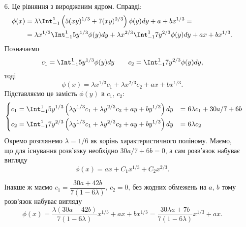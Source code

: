 \begin{solution}
\begin{enumerate}
        \item[6.] Це рівняння з виродженим ядром. Справді: 
        \begin{equation*} \begin{aligned}
        \phi(x) &= \lambda\Int_{-1}^1 \left(5(xy)^{1/3} + 7(xy)^{2/3}\right) \phi(y) dy + a + bx^{1/3} = \\ 
        &= \lambda x^{1/3}\Int_{-1}^1 5y^{1/3}\phi(y) dy + \lambda x^{2/3}\Int_{-1}^1 7y^{2/3} \phi(y) dy + ax + bx^{1/3}. 
        \end{aligned} \end{equation*}
        Позначаємо
        \[ c_1 = \Int_{-1}^1 5y^{1/3} \phi(y) dy \qquad c_2 = \Int_{-1}^1 7y^{2/3} \phi(y) dy, \]
        тоді
        \[ \phi(x) = \lambda x^{1/3} c_1 + \lambda x^{2/3} c_2 + ax + bx^{1/3}. \]
        Підставляємо це замість $\phi(y)$ в $c_1$, $c_2$:
        \begin{equation*}\left\{\begin{aligned} 
            c_1 &= \Int_{-1}^1 5y^{1/3} \left(\lambda y^{1/3} c_1 + \lambda y^{2/3} c_2 + ay + by^{1/3}\right) dy &=& \,\, 6\lambda c_1 + 30a/7 + 6b \\
            c_2 &= \Int_{-1}^1 7y^{2/3} \left(\lambda y^{1/3} c_1 + \lambda y^{2/3} c_2 + ay + by^{1/3}\right) dy &=& \,\, 6\lambda c_2 
        \end{aligned}\right.\end{equation*}
        Окремо розглянемо $\lambda = 1/6$ як корінь характеристичного поліному. Маємо, що для існування розв'язку необхідно $30a/7 + 6b = 0$, а сам розв'язок набуває вигляду \[\phi(x) = ax + C_1 x^{1/3} + C_2 x^{2/3}. \]

        Інакше ж маємо $c_1 = \dfrac{30a + 42b}{7(1 - 6\lambda)}$, $c_2 = 0$, без жодних обмежень на $a$, $b$ тому розв'язок набуває вигляду \[\phi(x) = \dfrac{\lambda(30a + 42b)}{7(1 - 6\lambda)}x^{1/3} + ax + bx^{1/3} = \dfrac{30\lambda a + 7b}{7(1 - 6\lambda)}x^{1/3} + ax. \]

    \end{enumerate}
\end{solution}

